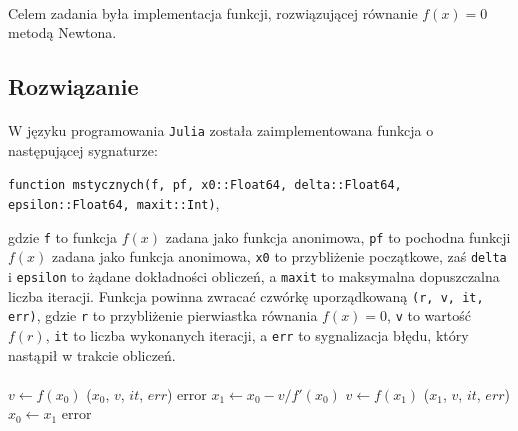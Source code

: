 \documentclass[a4paper]{article}
\begin{document}
\paragraph{}
Celem zadania była implementacja funkcji, rozwiązującej równanie $f(x) = 0$ metodą Newtona.

\subsection{Rozwiązanie}
\paragraph{}
W języku programowania \texttt{Julia} została zaimplementowana funkcja o następującej sygnaturze:
\begin{center}
\texttt{function mstycznych(f, pf, x0::Float64, delta::Float64, epsilon::Float64, maxit::Int)},
\end{center}

gdzie \texttt{f} to funkcja $f(x)$ zadana jako funkcja anonimowa, \texttt{pf} to pochodna funkcji $f(x)$ zadana jako funkcja anonimowa, \texttt{x0} to przybliżenie początkowe, zaś \texttt{delta} i \texttt{epsilon} to żądane dokładności obliczeń, a \texttt{maxit} to maksymalna dopuszczalna liczba iteracji. Funkcja powinna zwracać czwórkę uporządkowaną \texttt{(r, v, it, err)}, gdzie \texttt{r} to przybliżenie pierwiastka równania $f(x) = 0$, \texttt{v} to wartość $f(r)$, \texttt{it} to liczba wykonanych iteracji, a \texttt{err} to sygnalizacja błędu, który nastąpił w trakcie obliczeń.

\paragraph{}
\begin{center}
	\begin{algorithmic}[1]
    	\State $v\gets f(x_{0})$
    		\State \Return ($x_{0}$, $v$, $it$, $err$)
    	\EndIf
    			\State \Return error
    		\EndIf
    		\State $x_{1}\gets x_{0} - v / f'(x_{0})$
    		\State $v\gets f(x_{1})$
    			\State \Return ($x_{1}$, $v$, $it$, $err$)
    		\EndIf
    		\State $x_{0}\gets x_{1}$
    	\EndFor
    	\State \Return error
	\EndFunction
	\end{algorithmic}
\end{center}
\end{document}

